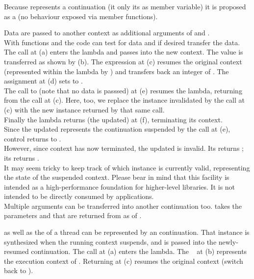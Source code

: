 \label{design}

Because \cont represents a continuation (it  only its
 as member variable) it is proposed as a
 (no behaviour exposed via member functions).


\label{subsec:data}

Data are passed to another context as additional arguments of \call and
\resume.\\
With functions \davail and \dget the code can test for data and if desired
transfer the data.
The  call at (a) enters the lambda and passes  into the
new context. The value is transferred as shown by (b). The expression
 at (c) resumes the original context (represented
within the lambda by ) and transfers back an integer of .
The assignment at (d) sets  to .\\
The call to  (note that no data is passsed) at (e) resumes the
 lambda, returning from the  call at (c). Here, too,
we replace the \cont instance  invalidated by the \resume call at (c)
with the new instance returned by that same \resume call.\\
Finally the lambda returns (the updated)  at (f), terminating its
context.\\
Since the updated  represents the continuation suspended by the call at
(e), control returns to \main.\\
However, since context  has now terminated, the updated  is
invalid. Its \opbool returns ; its  returns
.\\
It may seem tricky to keep track of which \cont instance is currently valid,
representing the state of the suspended context. Please bear in mind that this
facility is intended as a high-performance foundation for higher-level
libraries. It is not intended to be directly consumed by applications.\\
Multiple arguments can be transferred into another continuation too.
\call takes the parameters  and  that are returned from \dget
as  of .


\label{subsec:main}

\main as well as the \entryfn of a thread can be represented by an continuation.
That \cont instance is synthesized when the running context suspends, and is
passed into the newly-resumed continuation.
The  call at (a) enters the lambda. The \cont\  at (b)
represents the execution context of \main. Returning  at (c) resumes the
original context (switch back to \main).


